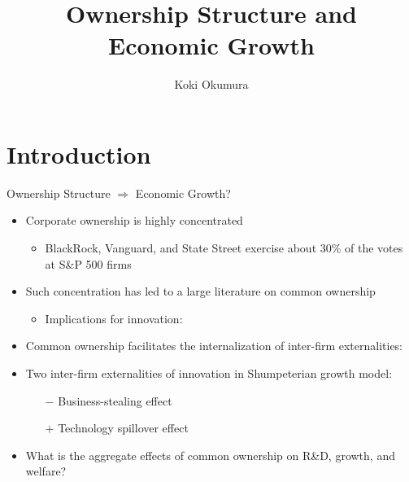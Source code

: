 \documentclass[
  10pt,
  aspectratio=169,   %
]{beamer}
\title{Ownership Structure and Economic Growth}
\author{Koki Okumura}
\institute{UCLA}
\date{}
\theoremstyle{plain}
\begin{document}
\begin{frame}
  \titlepage
\end{frame}

\section{Introduction}

\begin{frame}{Ownership Structure $\Longrightarrow$ Economic Growth?}
  \label{intro}
  \begin{itemize}
    \item Corporate ownership is highly concentrated \citep{Backus2021-yt} \hfill \hyperlink{share}{}
          \begin{itemize}
            \item BlackRock, Vanguard, and State Street exercise about 30\% of the votes at S\&P 500 firms
          \end{itemize}
          \medskip{} \pause
    \item Such concentration has led to a large literature on common ownership
    \begin{itemize}
      \item Implications for innovation: \citet{Lopez2019-sl, Kini2024-kd, Anton2024-pw}
    \end{itemize}
          \medskip{}\pause
    \item Common ownership facilitates the internalization of inter-firm externalities: \\ \citet{Rotemberg1984-jz, Azar2022-cn, Ederer2024-rw}
          \medskip{} \pause
    \item Two inter-firm externalities of innovation in Shumpeterian growth model:
          \begin{itemize}
            \item[$-$] \alert{Business-stealing effect}
            \item[$+$] \alert{Technology spillover effect}
          \end{itemize}
          \medskip{} \pause
    \item What is \alert{the aggregate effects} of common ownership on R\&D, growth, and welfare?
  \end{itemize}
\end{frame}
\end{document}
